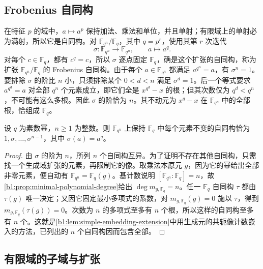 \subsection{Frobenius 自同构}
\label{b1:subsec:1702:02}

在特征 \(p\) 的域中，\(a\mapsto a^p\) 保持加法、乘法和单位，并且单射；有限域上的单射必为满射，所以它是自同构。对 \(\mathbb F_{q^n}/\mathbb F_q\)，其中 \(q=p^r\)，使用其第 \(r\) 次迭代
\[
	\sigma:\mathbb F_{q^n}\longrightarrow\mathbb F_{q^n},\qquad a\longmapsto a^q.
\]
对每个 \(c\in\mathbb F_q\)，都有 \(c^q=c\)，所以 \(\sigma\) 逐点固定 \(\mathbb F_q\)，确是这个扩张的自同构，称为扩张 \(\mathbb F_{q^n}/\mathbb F_q\) 的 Frobenius 自同构。由于每个 \(a\in\mathbb F_{q^n}\) 都满足 \(a^{q^n}=a\)，有 \(\sigma^n=1\)。要排除 \(\sigma\) 的阶比 \(n\) 小，只须排除某个 \(0<d<n\) 满足 \(\sigma^d=1\)。后一个等式要求 \(a^{q^d}=a\) 对全部 \(q^n\) 个元素成立，即它们全是 \(x^{q^d}-x\) 的根；但其次数仅为 \(q^d<q^n\)，不可能有这么多根。因此 \(\sigma\) 的阶恰为 \(n\)。其不动元为 \(x^q-x\) 在 \(\mathbb F_{q^n}\) 中的全部根，恰组成 \(\mathbb F_q\)。

\begin{theorem}\label{b1:thm:finite-field-automorphisms}
	设 \(q\) 为素数幂，\(n\geq1\) 为整数。则 \(\mathbb F_{q^n}\) 上保持 \(\mathbb F_q\) 中每个元素不变的自同构恰为 \(1,\sigma,\ldots,\sigma^{n-1}\)，其中 \(\sigma(a)=a^q\)。
\end{theorem}
\begin{proof}
	由 \(\sigma\) 的阶为 \(n\)，所列 \(n\) 个自同构互异。为了证明不存在其他自同构，只需找一个生成域扩张的元素，再限制它的像。取乘法本原元 \(g\)，因为它的幂给出全部非零元素，便自动有 \(\mathbb F_{q^n}=\mathbb F_q(g)\)。基计数说明 \([\mathbb F_{q^n}:\mathbb F_q]=n\)，故\cref{b1:prop:minimal-polynomial-degree}给出 \(\deg m_{g,\mathbb F_q}=n\)。任一 \(\mathbb F_q\) 自同构 \(\tau\) 都由 \(\tau(g)\) 唯一决定；又因它固定最小多项式的系数，对 \(m_{g,\mathbb F_q}(g)=0\) 施以 \(\tau\)，得到 \(m_{g,\mathbb F_q}(\tau(g))=0\)。次数为 \(n\) 的多项式至多有 \(n\) 个根，所以这样的自同构至多有 \(n\) 个。这就是\cref{b1:lem:simple-embedding-extension}中用生成元的共轭像计数嵌入的方法，已列出的 \(n\) 个自同构因而包含全部。
\end{proof}

\subsection{有限域的子域与扩张}
\label{b1:subsec:1702:03}

